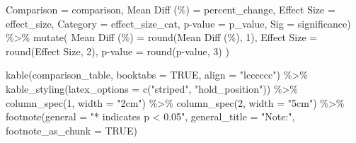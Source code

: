 \documentclass[
  11pt,
]{article}
\newenvironment{Shaded}{\begin{snugshade}}{\end{snugshade}}
\newcommand{\AttributeTok}[1]{\textcolor[rgb]{0.40,0.45,0.13}{#1}}
\newcommand{\ConstantTok}[1]{\textcolor[rgb]{0.56,0.35,0.01}{#1}}
\newcommand{\DecValTok}[1]{\textcolor[rgb]{0.68,0.00,0.00}{#1}}
\newcommand{\FunctionTok}[1]{\textcolor[rgb]{0.28,0.35,0.67}{#1}}
\newcommand{\NormalTok}[1]{\textcolor[rgb]{0.00,0.23,0.31}{#1}}
\newcommand{\OtherTok}[1]{\textcolor[rgb]{0.00,0.23,0.31}{#1}}
\newcommand{\SpecialCharTok}[1]{\textcolor[rgb]{0.37,0.37,0.37}{#1}}
\newcommand{\StringTok}[1]{\textcolor[rgb]{0.13,0.47,0.30}{#1}}
\begin{document}
\begin{Shaded}
\begin{Highlighting}[]
         \AttributeTok{Comparison =}\NormalTok{ comparison,}
         \StringTok{\textasciigrave{}}\AttributeTok{Mean Diff (\%)}\StringTok{\textasciigrave{}} \OtherTok{=}\NormalTok{ percent\_change,}
         \StringTok{\textasciigrave{}}\AttributeTok{Effect Size}\StringTok{\textasciigrave{}} \OtherTok{=}\NormalTok{ effect\_size,}
         \StringTok{\textasciigrave{}}\AttributeTok{Category}\StringTok{\textasciigrave{}} \OtherTok{=}\NormalTok{ effect\_size\_cat,}
         \StringTok{\textasciigrave{}}\AttributeTok{p{-}value}\StringTok{\textasciigrave{}} \OtherTok{=}\NormalTok{ p\_value,}
         \AttributeTok{Sig =}\NormalTok{ significance) }\SpecialCharTok{\%\textgreater{}\%}
  \FunctionTok{mutate}\NormalTok{(}
    \StringTok{\textasciigrave{}}\AttributeTok{Mean Diff (\%)}\StringTok{\textasciigrave{}} \OtherTok{=} \FunctionTok{round}\NormalTok{(}\StringTok{\textasciigrave{}}\AttributeTok{Mean Diff (\%)}\StringTok{\textasciigrave{}}\NormalTok{, }\DecValTok{1}\NormalTok{),}
    \StringTok{\textasciigrave{}}\AttributeTok{Effect Size}\StringTok{\textasciigrave{}} \OtherTok{=} \FunctionTok{round}\NormalTok{(}\StringTok{\textasciigrave{}}\AttributeTok{Effect Size}\StringTok{\textasciigrave{}}\NormalTok{, }\DecValTok{2}\NormalTok{),}
    \StringTok{\textasciigrave{}}\AttributeTok{p{-}value}\StringTok{\textasciigrave{}} \OtherTok{=} \FunctionTok{round}\NormalTok{(}\StringTok{\textasciigrave{}}\AttributeTok{p{-}value}\StringTok{\textasciigrave{}}\NormalTok{, }\DecValTok{3}\NormalTok{)}
\NormalTok{  )}

\FunctionTok{kable}\NormalTok{(comparison\_table, }\AttributeTok{booktabs =} \ConstantTok{TRUE}\NormalTok{, }\AttributeTok{align =} \StringTok{"lcccccc"}\NormalTok{) }\SpecialCharTok{\%\textgreater{}\%}
  \FunctionTok{kable\_styling}\NormalTok{(}\AttributeTok{latex\_options =} \FunctionTok{c}\NormalTok{(}\StringTok{"striped"}\NormalTok{, }\StringTok{"hold\_position"}\NormalTok{)) }\SpecialCharTok{\%\textgreater{}\%}
  \FunctionTok{column\_spec}\NormalTok{(}\DecValTok{1}\NormalTok{, }\AttributeTok{width =} \StringTok{"2cm"}\NormalTok{) }\SpecialCharTok{\%\textgreater{}\%}
  \FunctionTok{column\_spec}\NormalTok{(}\DecValTok{2}\NormalTok{, }\AttributeTok{width =} \StringTok{"5cm"}\NormalTok{) }\SpecialCharTok{\%\textgreater{}\%}
  \FunctionTok{footnote}\NormalTok{(}\AttributeTok{general =} \StringTok{"* indicates p \textless{} 0.05"}\NormalTok{, }
           \AttributeTok{general\_title =} \StringTok{"Note:"}\NormalTok{, }
           \AttributeTok{footnote\_as\_chunk =} \ConstantTok{TRUE}\NormalTok{)}
\end{Highlighting}
\end{Shaded}
\end{document}
